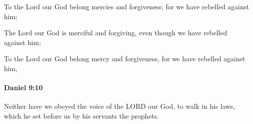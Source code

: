 			\begin{versebox}
					\item[BHS] 
					\item[LXX] 
					\item[ASV] To the Lord our God belong mercies and forgiveness; for we have rebelled against him;
					\item[NIV] The Lord our God is merciful and forgiving, even though we have rebelled against him;
					\item[NRSV] To the Lord our God belong mercy and forgiveness, for we have rebelled against him,
			\end{versebox}

		\paragraph{Daniel 9:10} %
			\label{DANIEL-9-10}

			Neither have we obeyed the voice of the LORD our God, to walk in his laws, which he set before us by his servants the prophets.

